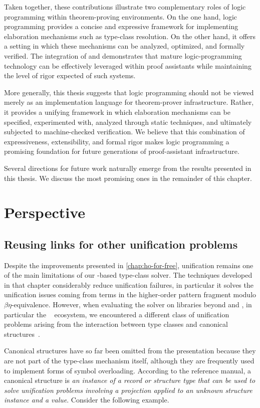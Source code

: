 Taken together, these contributions illustrate two complementary roles of logic
programming within theorem-proving environments. On the one hand, logic
programming provides a concise and expressive framework for implementing
elaboration mechanisms such as type-class resolution. On the other hand, it
offers a setting in which these mechanisms can be analyzed, optimized, and
formally verified. The integration of \rocq and \elpi demonstrates that mature
logic-programming technology can be effectively leveraged within proof
assistants while maintaining the level of rigor expected of such systems.

More generally, this thesis suggests that logic programming should not be
viewed merely as an implementation language for theorem-prover infrastructure.
Rather, it provides a unifying framework in which elaboration mechanisms can be
specified, experimented with, analyzed through static techniques, and
ultimately subjected to machine-checked verification. We believe that this
combination of expressiveness, extensibility, and formal rigor makes logic
programming a promising foundation for future generations of proof-assistant
infrastructure.

Several directions for future work naturally emerge from the results presented
in this thesis. We discuss the most promising ones in the remainder of this
chapter.

\section{Perspective}

\subsection{Reusing links for other unification problems}

Despite the improvements presented in \cref{chap:ho-for-free},
unification remains one of the main limitations of our \elpi-based type-class
solver. The techniques developed in that chapter considerably reduce unification
failures, in particular it solves the unification issues coming
from terms in the higher-order pattern fragment modulo
$\beta\eta$-equivalence. However, when evaluating the solver on libraries beyond
\tlc and \stdpp, in particular the \iris~\cite{iris-junk} ecosystem, we
encountered a different class of unification problems arising from the
interaction between type classes and canonical structures~\cite{cs}.

Canonical structures have so far been omitted from the presentation because they
are not part of the type-class mechanism itself, although they are frequently
used to implement forms of symbol overloading. According to the \rocq reference
manual, a canonical structure is \textit{an instance of a record or structure
type that can be used to solve unification problems involving a projection
applied to an unknown structure instance and a value}. Consider the following
example.

